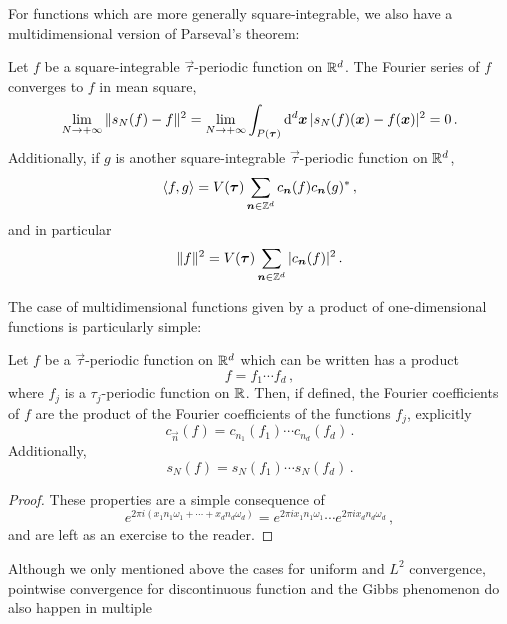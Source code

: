 For functions which are more generally square-integrable, we also have a multidimensional
version of Parseval's theorem:
\begin{theorem}[Parseval]
	Let $f$ be a square-integrable $\vec{\tau}$-periodic function on $\mathbb{R}^d$. The Fourier
	series of $f$ converges to $f$ in mean square, \ie
	\begin{equation}
		\lim_{N\to+\infty}\|s_N(f)-f\|^2=\lim_{N\to+\infty}
		\int_{P(\bm{\tau})}\mathrm{d}^d\bm{x}\,|s_N(f)(\bm{x})-f(\bm{x})|^2=0\,.
	\end{equation}
	Additionally, if $g$ is another square-integrable $\vec{\tau}$-periodic function on
	$\mathbb{R}^d$,
	\begin{equation}
		\braket{f,g}=V(\bm{\tau})\sum_{\bm{n}\in\mathbb{Z}^d}c_{\bm{n}}(f)c_{\bm{n}}(g)^*\,,
	\end{equation}
	and in particular
	\begin{equation}
		\|f\|^2=V(\bm{\tau})\sum_{\bm{n}\in\mathbb{Z}^d}|c_{\bm{n}}(f)|^2\,.
	\end{equation}
\end{theorem}
The case of multidimensional functions given by a product of one-dimensional functions is
particularly simple:
\begin{proposition}
	Let $f$ be a $\vec{\tau}$-periodic function on $\mathbb{R}^d$ which can be written has a product
	\begin{equation}
		f=f_1\cdots f_d\,,
	\end{equation}
	where $f_j$ is a $\tau_j$-periodic function on $\mathbb{R}$. Then, if defined, the Fourier
	coefficients of $f$ are the product of the Fourier coefficients of the functions $f_j$,
	explicitly
	\begin{equation}
		c_{\vec{n}}(f)=c_{n_1}(f_1)\cdots c_{n_d}(f_d)\,.
	\end{equation}
	Additionally,
	\begin{equation}
		s_N(f)=s_N(f_1)\cdots s_N(f_d)\,.
	\end{equation}
\end{proposition}
\begin{proof}
	These properties are a simple consequence of
	\begin{equation}
		e^{2\pi i(x_1n_1\omega_1+\cdots+x_dn_d\omega_d)}=e^{2\pi ix_1n_1\omega_1}\cdots
		e^{2\pi ix_dn_d\omega_d}\,,
	\end{equation}
	and are left as an exercise to the reader.
\end{proof}
Although we only mentioned above the cases for uniform and $L^2$ convergence, pointwise
convergence for discontinuous function and the Gibbs phenomenon do also happen in multiple
